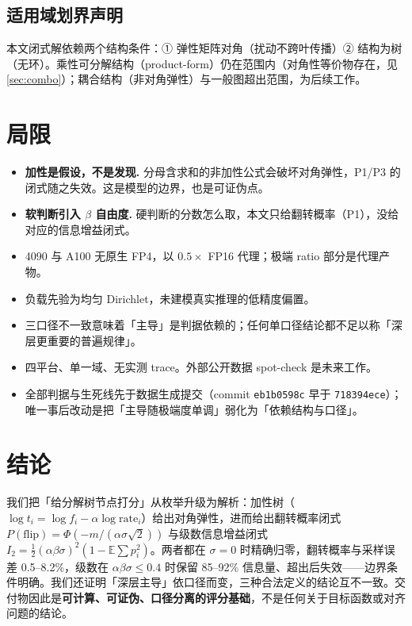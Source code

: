 \documentclass[12pt]{ctexart}
\newcommand{\E}{\mathbb{E}}
\newcommand{\rate}{\mathrm{rate}}
\newcommand{\flip}{\mathrm{flip}}
\begin{document}
\subsection{适用域划界声明}

本文闭式解依赖两个结构条件：① 弹性矩阵对角（扰动不跨叶传播）② 结构为树（无环）。乘性可分解结构（product-form）仍在范围内（对角性等价物存在，见 \ref{sec:combo}）；耦合结构（非对角弹性）与一般图超出范围，为后续工作。

\section{局限}
\begin{itemize}
  \item \textbf{加性是假设，不是发现.} 分母含求和的非加性公式会破坏对角弹性，P1/P3 的闭式随之失效。这是模型的边界，也是可证伪点。
  \item \textbf{软判断引入 $\beta$ 自由度.} 硬判断的分数怎么取，本文只给翻转概率（P1），没给对应的信息增益闭式。
  \item 4090 与 A100 无原生 FP4，以 $0.5\times$ FP16 代理；极端 ratio 部分是代理产物。
  \item 负载先验为均匀 Dirichlet，未建模真实推理的低精度偏置。
  \item 三口径不一致意味着「主导」是判据依赖的；任何单口径结论都不足以称「深层更重要的普遍规律」。
  \item 四平台、单一域、无实测 trace。外部公开数据 spot-check 是未来工作。
  \item 全部判据与生死线先于数据生成提交（commit \texttt{eb1b0598c} 早于 \texttt{718394ece}）；唯一事后改动是把「主导随极端度单调」弱化为「依赖结构与口径」。
\end{itemize}

\section{结论}

我们把「给分解树节点打分」从枚举升级为解析：加性树（$\log t_i=\log f_i-\alpha\log\rate_i$）给出对角弹性，进而给出翻转概率闭式 $P(\flip)=\Phi(-m/(\alpha\sigma\sqrt2))$ 与级数信息增益闭式 $I_2=\tfrac12(\alpha\beta\sigma)^2(1-\E\sum p_i^2)$。两者都在 $\sigma=0$ 时精确归零，翻转概率与采样误差 0.5--8.2\%，级数在 $\alpha\beta\sigma\le0.4$ 时保留 85--92\% 信息量、超出后失效——边界条件明确。我们还证明「深层主导」依口径而变，三种合法定义的结论互不一致。交付物因此是\textbf{可计算、可证伪、口径分离的评分基础}，不是任何关于目标函数或对齐问题的结论。
\end{document}
